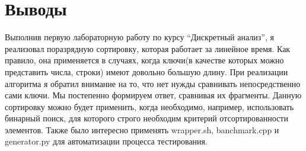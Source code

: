 \section{Выводы}
{\itshape}

Выполнив первую лабораторную работу по курсу \enquote{Дискретный анализ}, я реализовал поразрядную сортировку, которая работает за линейное время. Как правило, она применяется в случаях, когда ключи(в качестве которых можно представить числа, строки)  имеют довольно большую длину. При реализации алгоритма я обратил внимание на то, что нет нужды сравнивать непосредственно сами ключи. Мы постепенно формируем ответ, сравнивая их фрагменты.\newline
Данную сортировку можно будет применить, когда необходимо, например, использовать бинарный поиск, для которого строго необходим критерий отсортированности элементов. \newline
Также было интересно применять wrapper.sh, banchmark.cpp и generator.py для автоматизации процесса тестирования. 
\pagebreak